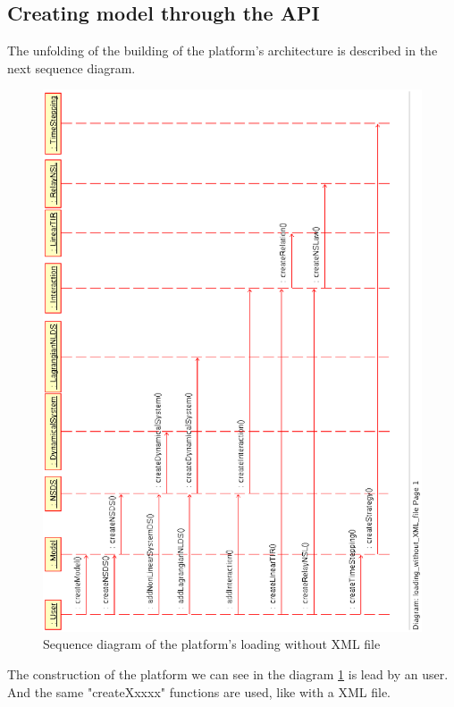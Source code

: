 \subsection{Creating model through the API}
 The unfolding of the building of the platform's architecture is described in the next sequence diagram.
\begin{figure}
\begin{center}
        \includegraphics[scale=0.75, clip]{figure/platform_loading.ps}
        \caption{Sequence diagram of the platform's loading without XML file}
        \label{fig: platform's loading2}
\end{center}
\end{figure}

The construction of the platform we can see in the diagram \ref{fig: platform's loading2} is lead by an user. And the same "createXxxxx" functions are used, like with a XML file.



